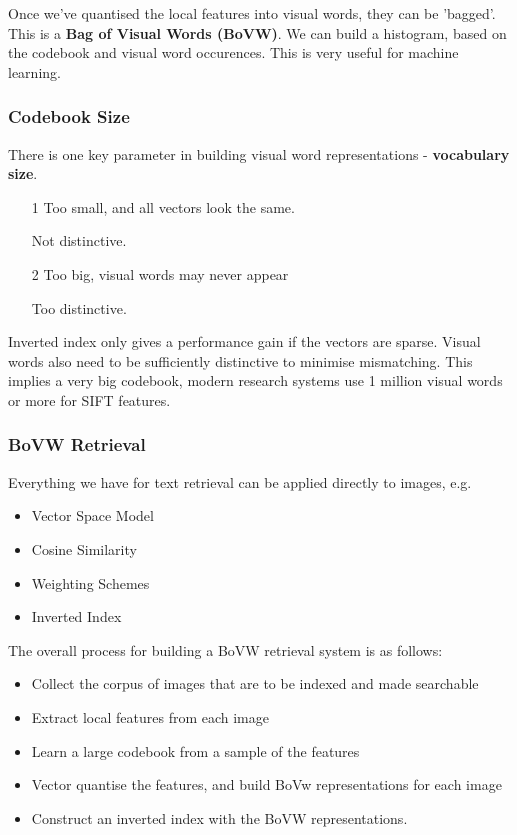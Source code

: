 Once we've quantised the local features into visual words, they can be 'bagged'. This is a \textbf{Bag of Visual Words (BoVW)}. We can build a histogram, based on the codebook and visual word occurences. This is very useful for machine learning.

\subsubsection{Codebook Size}

There is one key parameter in building visual word representations - \textbf{vocabulary size}.

\begin{itemize}
    \itemsep0em 
    \item [1] Too small, and all vectors look the same.
    \item [] Not distinctive.
    \item [2] Too big, visual words may never appear
    \item [] Too distinctive.
\end{itemize}

\noindent Inverted index only gives a performance gain if the vectors are sparse. Visual words also need to be sufficiently distinctive to minimise mismatching. This implies a very big codebook, modern research systems use 1 million visual words or more for SIFT features.

\subsubsection{BoVW Retrieval}

Everything we have for text retrieval can be applied directly to images, e.g.

\begin{itemize}
    \itemsep0em
    \item Vector Space Model
    \item Cosine Similarity
    \item Weighting Schemes
    \item Inverted Index
\end{itemize}

\noindent The overall process for building a BoVW retrieval system is as follows:

\begin{itemize}
    \itemsep0em
    \item Collect the corpus of images that are to be indexed and made searchable
    \item Extract local features from each image
    \item Learn a large codebook from a sample of the features
    \item Vector quantise the features, and build BoVw representations for each image
    \item Construct an inverted index with the BoVW representations.
\end{itemize}

